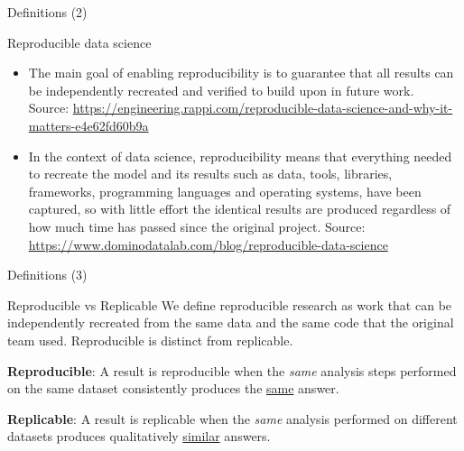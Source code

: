 \documentclass[10pt,aspectratio=169]{beamer} %
\begin{document}
\begin{frame}[label=frame5]{Definitions (2)}
	\begin{alertblock}{Reproducible data science}
		\begin{itemize}
			\item The main goal of enabling reproducibility is to guarantee that all results can be independently recreated and verified to build upon in future work.\\
			Source: \url{https://engineering.rappi.com/reproducible-data-science-and-why-it-matters-e4e62fd60b9a}
			\item In the context of data science, reproducibility means that everything needed to recreate the model and its results such as data, tools, libraries, frameworks, programming languages and operating systems, have been captured, so with little effort the identical results are produced regardless of how much time has passed since the original project.
			Source: \url{https://www.dominodatalab.com/blog/reproducible-data-science}
		\end{itemize}	
	\end{alertblock}
\end{frame}
\begin{frame}[label=frame6]{Definitions (3)}
	\begin{alertblock}{Reproducible vs Replicable}
			We define reproducible research as work that can be independently recreated from the same data and the same code that the original team used. 
			Reproducible is distinct from replicable.
			\vspace{5mm}
			
			\textbf{Reproducible}: A result is reproducible when the \emph{same} analysis steps performed on the \alert{same dataset} consistently produces the \underline{same} answer.
			
			\textbf{Replicable}: A result is replicable when the \emph{same} analysis performed on \alert{different datasets} produces qualitatively \underline{similar} answers.
	\end{alertblock}
\end{frame}
\end{document}
